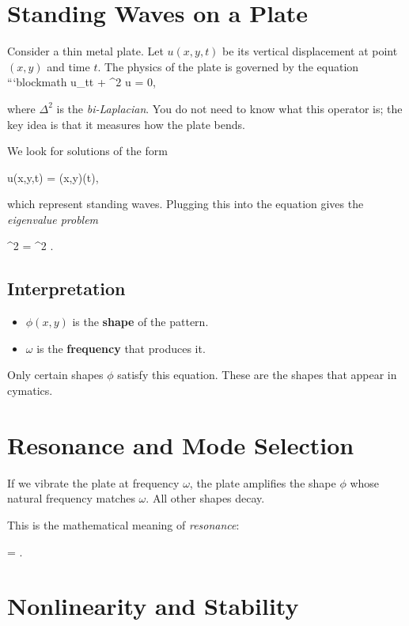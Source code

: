 \documentclass{article}
\begin{document}
\section{Standing Waves on a Plate}

Consider a thin metal plate. Let $u(x,y,t)$ be its vertical displacement at point $(x,y)$ and time
$t$. The physics of the plate is governed by the equation
```blockmath
u_{tt} + \Delta^2 u = 0,


where $\Delta^2$ is the \emph{bi-Laplacian}. You do not need to know what this operator is; the key idea is that it measures how the plate bends.

We look for solutions of the form

u(x,y,t) = \phi(x,y)\cos(\omega t),


which represent standing waves. Plugging this into the equation gives the \emph{eigenvalue problem}

\Delta^2 \phi = \omega^2 \phi.


\subsection{Interpretation} \begin{itemize} \item $\phi(x,y)$ is the \textbf{shape} of the pattern. \item $\omega$ is the \textbf{frequency} that produces it. \end{itemize}

Only certain shapes $\phi$ satisfy this equation. These are the shapes that appear in cymatics.

\section{Resonance and Mode Selection}

If we vibrate the plate at frequency $\omega$, the plate amplifies the shape $\phi$ whose natural frequency matches $\omega$. All other shapes decay.

This is the mathematical meaning of \emph{resonance}:

 =  \quad \Rightarrow \quad {}.


\section{Nonlinearity and Stability}
\end{document}
